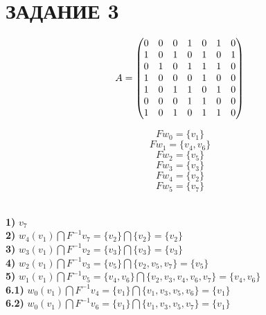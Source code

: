 \documentclass[14pt]{extarticle}
\begin{document}
\section*{\centering ЗАДАНИЕ 3}
\[
\centering
A = \begin{pmatrix}
0 & 0 & 0 & 1 & 0 & 1 & 0 \\
1 & 0 & 1 & 0 & 1 & 0 & 1 \\
0 & 1 & 0 & 1 & 1 & 1 & 0 \\
1 & 0 & 0 & 0 & 1 & 0 & 0 \\
1 & 0 & 1 & 1 & 0 & 1 & 0 \\
0 & 0 & 0 & 1 & 1 & 0 & 0 \\
1 & 0 & 1 & 0 & 1 & 1 & 0
\end{pmatrix}
\]



\begin{minipage}{0.55\textwidth}
\end{minipage}
\begin{minipage}{0.4\textwidth}
    \[Fw_0 = \{v_1\}\]
    \vspace{1.3cm}
    \[Fw_1 = \{v_4, v_6\}\]
    \vspace{1.3cm}
    \[Fw_2 = \{v_5\}\]
    \vspace{1.3cm}
    \[Fw_3 = \{v_3\}\]
    \vspace{1.3cm}
    \[Fw_4 = \{v_2\}\]
    \vspace{1.3cm}
    \[Fw_5 = \{v_7\}\]
    \vspace{0.01cm}
    
\end{minipage}
\\
\textbf{1)} \(v_7\)\\
\textbf{2)} \(w_4(v_1) \bigcap F^{-1}v_7 = \{v_2\} \bigcap \{v_2\} = \{v_2\}\)\\
\textbf{3)} \(w_3(v_1) \bigcap F^{-1}v_2 = \{v_3\} \bigcap \{v_3\} = \{v_3\}\)\\
\textbf{4)} \(w_2(v_1) \bigcap F^{-1}v_3 = \{v_5\} \bigcap \{v_2, v_5, v_7\} = \{v_5\}\)\\
\textbf{5)} \(w_1(v_1) \bigcap F^{-1}v_5 = \{v_4, v_6\} \bigcap \{v_2, v_3, v_4, v_6, v_7\} = \{v_4, v_6\}\)\\
\textbf{6.1)} \(w_0(v_1) \bigcap F^{-1}v_4 = \{v_1\} \bigcap \{v_1, v_3, v_5, v_6\} = \{v_1\}\)\\
\textbf{6.2)} \(w_0(v_1) \bigcap F^{-1}v_6 = \{v_1\} \bigcap \{v_1, v_3, v_5, v_7\} = \{v_1\}\) \\
\end{document}
